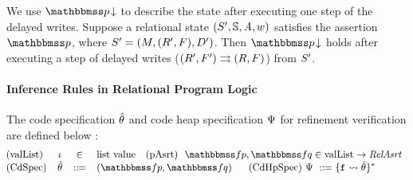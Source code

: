 {\color{blue}
We use $\nxtAst{\relastP}$ to describe the
state after executing one step of the delayed writes.
Suppose a relational state
$(S', \mathbb{S}, \textit{A}, w)$ satisfies the
assertion $\relastP$, where $S' = (M, (R', F), D')$.
Then $\nxtAst{\relastP}$ holds after executing a step
of delayed writes (${(R', F')}\rightrightarrows{(R, F)}$)
from $S'$.
}

\paragraph{Inference Rules in Relational Program Logic}
The code specification $\hat{\theta}$ and code heap specification
$\Psi$ for refinement verification are defined below :
\[
    \small
    \!\!\!\!
    \begin{array}{lccl}
        \TYPE{(valList)} &
        \lgvl & \in & \TYPE{list} \ \TYPE{value}
        \ \ \
        \TYPE{(pAsrt)} \ \
        \relspecpre, \relspecpost \in
        \TYPE{valList} \rightarrow \textit{RelAsrt} \\
        \TYPE{(CdSpec)} & \RelBspec & \define &
        (\relspecpre, \relspecpost) \quad \ \
        \TYPE{(CdHpSpec)} \ \Cspec \ \define \
        \{ \lab{} \rightsquigarrow \RelBspec \}^{*}
    \end{array}
\]
			
				
